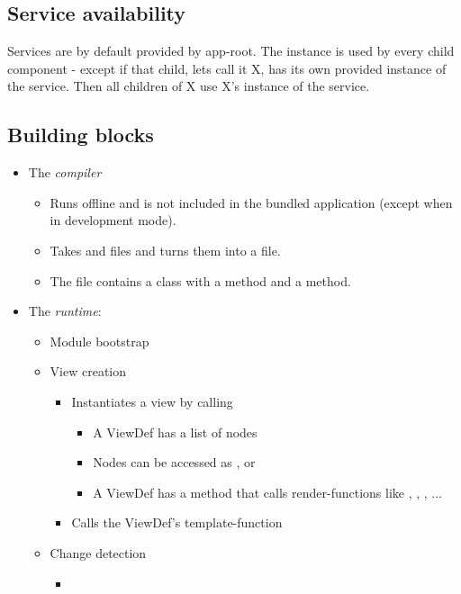 \subsection{Service availability}
Services are by default provided by app-root. The instance is used by every child component - except if that child, lets call it X, has its own provided instance of the service. Then all children of X use X's instance of the service.


\subsection{Building blocks}

\begin{itemize}
    \item The \emph{compiler} 
        \begin{itemize}
            \item Runs offline and is not included in the bundled application (except when in development mode).
            \item Takes  and  files and turns them into a  file.
            \item The  file contains a  class with a  method and a  method.
        \end{itemize} 
    \item The \emph{runtime}:  
        \begin{itemize}
            \item Module bootstrap
            \item View creation
                \begin{itemize}
                    \item Instantiates a view by calling  
                        \begin{itemize}
                            \item A ViewDef has a list of nodes 
                            \item Nodes can be accessed as ,  or 
                            \item A ViewDef has a  method that calls render-functions like , , , ...
                        \end{itemize}
                    \item Calls the ViewDef's template-function 
                \end{itemize}
            \item Change detection 
                \begin{itemize}
                    \item 
                \end{itemize}
        \end{itemize}
\end{itemize}


